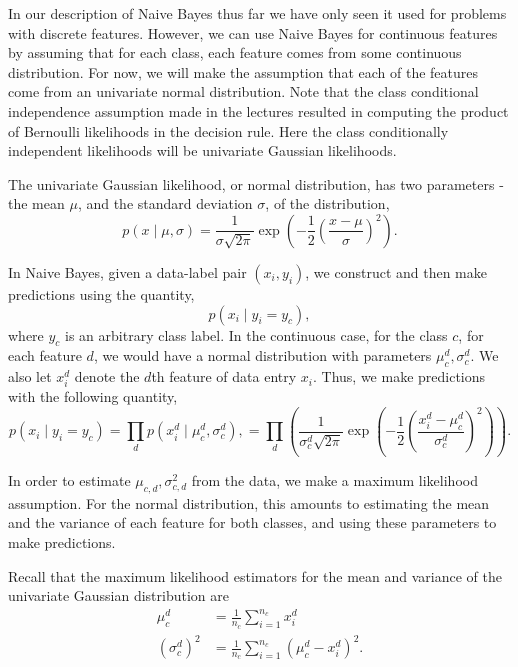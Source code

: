 In our description of Naive Bayes thus far we have only seen it used for problems with discrete features. However, we can use Naive Bayes for continuous features by assuming that for each class, each feature comes from some continuous distribution. For now, we will make the assumption that each of the features come from an univariate normal distribution.  Note that the class conditional independence assumption made in the lectures resulted in computing the product of Bernoulli likelihoods in the decision rule.  Here the class conditionally independent likelihoods will be univariate Gaussian likelihoods.

The univariate Gaussian likelihood, or normal distribution,  has two parameters - the mean $\mu$, and the standard deviation $\sigma$, of the distribution,
\begin{equation}   
    p(x \mid \mu, \sigma) = \frac{1}{\sigma \sqrt{2\pi}}\exp\left(-\frac{1}{2}\left(\frac{x - \mu}{\sigma}\right)^2\right).
\end{equation}

In Naive Bayes, given a data-label pair $(x_i, y_i)$, we construct and then make predictions using the quantity,
\begin{equation}   
    p(x_i \mid y_i = y_c),
\end{equation}
where $y_c$ is an arbitrary class label. In the continuous case, for the class $c$, for each feature $d$, we would have a normal distribution with parameters $\mu_{c}^d, \sigma_{c}^d$. We also let $x_i^d$ denote the $d$th feature of data entry $x_i$. Thus, we make predictions with the following quantity,
\begin{equation}\label{likelihood}    
p(x_i \mid y_i = y_c) = \prod_d p(x_{i}^d \mid \mu_{c}^d, \sigma_{c}^d),
=\prod_d \left( \frac{1}{\sigma_c^d \sqrt{2\pi}}\exp\left(-\frac{1}{2}\left(\frac{x_i^d - \mu_c^d}{\sigma_c^d}\right)^2\right)\right).
\end{equation}

In order to estimate $\mu_{c,d}, \sigma_{c,d}^2$ from the data, we make a maximum likelihood assumption. For the normal distribution, this amounts to estimating the mean and the variance of each feature for both classes, and using these parameters to make predictions.

Recall that the maximum likelihood estimators for the mean and variance of the univariate Gaussian distribution are
\begin{align*}
    \mu_{c}^d &= \frac{1}{n_c} \sum_{i=1}^{n_c} x_i^d \\
    (\sigma_{c}^d)^2 &= \frac{1}{n_c} \sum_{i=1}^{n_c}\left(\mu_c^d - x_i^d \right)^2. 
\end{align*}

